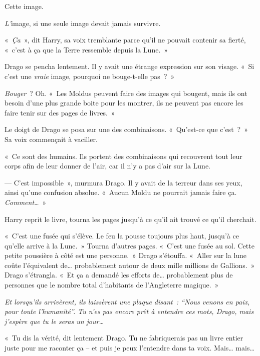 Cette image.

\emph{L'}image, si une seule image devait jamais survivre.

«~\emph{Ça}~», dit Harry, sa voix tremblante parce qu'il ne pouvait contenir sa fierté, «~c'est à ça que la Terre ressemble depuis la Lune.~»

Drago se pencha lentement. Il y avait une étrange expression sur son visage. «~Si c'est une \emph{vraie} image, pourquoi ne bouge-t-elle pas~?~»

\emph{Bouger}~? Oh. «~Les Moldus peuvent faire des images qui bougent, mais ils ont besoin d'une plus grande boite pour les montrer, ils ne peuvent pas encore les faire tenir sur des pages de livres.~»

Le doigt de Drago se posa sur une des combinaisons. «~Qu'est-ce que c'est~?~» Sa voix commençait à vaciller.

«~Ce sont des humains. Ils portent des combinaisons qui recouvrent tout leur corps afin de leur donner de l'air, car il n'y a pas d'air sur la Lune.

--- C'est impossible~», murmura Drago. Il y avait de la terreur dans ses yeux, ainsi qu'une confusion absolue. «~Aucun Moldu ne pourrait jamais faire ça. \emph{Comment…}~»

Harry reprit le livre, tourna les pages jusqu'à ce qu'il ait trouvé ce qu'il cherchait.

«~C'est une fusée qui s'élève. Le feu la pousse toujours plus haut, jusqu'à ce qu'elle arrive à la Lune.~» Tourna d'autres pages. «~C'est une fusée au sol. Cette petite poussière à côté est une personne.~» Drago s'étouffa. «~Aller sur la lune coûte l'équivalent de… probablement autour de deux mille millions de Gallions.~» Drago s'étrangla. «~Et ça a demandé les efforts de… probablement plus de personnes que le nombre total d'habitants de l'Angleterre magique.~»

\emph{Et lorsqu'ils arrivèrent, ils laissèrent une plaque disant~: “Nous venons en paix, pour toute l'humanité”. Tu n'es pas encore prêt à entendre ces mots, Drago, mais j'espère que tu le seras un jour…}

«~Tu dis la vérité, dit lentement Drago. Tu ne fabriquerais pas un livre entier juste pour me raconter ça -- et puis je peux l'entendre dans ta voix. Mais… mais…

